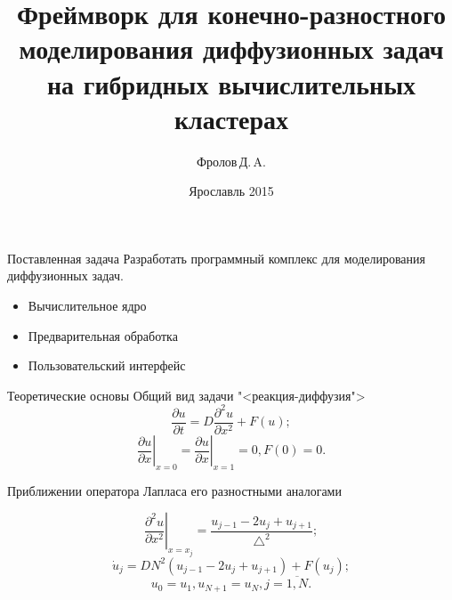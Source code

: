 \documentclass{beamer}
\begin{document}
	\title[]{Фреймворк для конечно-разностного моделирования диффузионных задач на гибридных вычислительных кластерах}  
	\author{Фролов\,Д.\,A.}
	\date{Ярославль 2015} 
	\frame{\titlepage} 

\begin{frame}{Поставленная задача}
	Разработать программный комплекс для моделирования диффузионных задач.
	\begin{itemize}
		\item Вычислительное ядро
		\item Предварительная обработка
		\item Пользовательский интерфейс
	\end{itemize}
\end{frame}




\begin{frame}{Теоретические основы}
Общий вид задачи "<реакция-диффузия">
$$\frac{\partial u}{\partial t} = D \frac{\partial^2 u}{\partial x^2} + F(u);$$
$$\left.{\frac{\partial u}{\partial x}} \right|_{x=0} = \left.{\frac{\partial u}{\partial x}} \right|_{x=1} = 0, F(0) = 0.$$


Приближении оператора Лапласа его разностными аналогами

$$\left.{\frac{\partial^2 u}{\partial x^2}}\right|_{x=x_j} = \frac{u_{j-1} - 2u_j + u_{j+1}}{\bigtriangleup^2};$$
$$\dot u_j = D N^2(u_{j-1} - 2u_j + u_{j+1}) + F(u_j);$$
$$u_0 = u_1, u_{N+1} = u_N, j = \overline{1, N}.$$
\end{frame}
\end{document}
